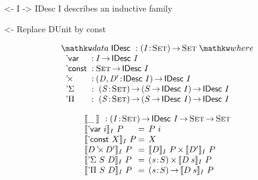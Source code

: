 \documentclass[preprint, authoryear, onecolumn]{sigplanconf}
\newenvironment{structure}{\footnotesize\verbatim}{\endverbatim}
\begin{document}

\begin{structure}
<- I -> IDesc I describes an inductive family
\end{structure}

\begin{structure}
<- Replace DUnit by const
\end{structure}


\[
\stk{
\data \IDesc{} : \PI{\V{I}}{\Set} \Set \where \\
\;\;\begin{array}{@{}l@{\::\:}l@{\quad}l}
    \DVar{}         & I \To \IDesc{I}                                   \\
    \DConst{}       & \Set \To \IDesc{I}                                \\
    \DProd{}{}      & \PI{\V{D}, \V{D'}}{\IDesc{I}} \IDesc{I}           \\
    \DSigma         & \PI{\V{S}}{\Set} \PIS{S \To \IDesc{I}} \IDesc{I}  \\
    \DPi            & \PI{\V{S}}{\Set} \PIS{S \To \IDesc{I}} \IDesc{I} 
\end{array}
}
\]


\[\stk{
\idescop{\_\:}{}{} : \PI{\V{I}}{\Set} \IDesc{I} \To \Set \To \Set                  \\
\begin{array}{@{}l@{\:=\:\:}ll}
\idescop{\DVar{i}}{I}{P}      &  P~i                                                 \\
\idescop{\DConst{X}}{I}{P}    &  X                                                   \\
\idescop{\DProd{D}{D'}}{I}{P} &  \TIMES{\idescop{D}{I}{P}}{\idescop{D'}{I}{P}}       \\
\idescop{\DSigma{S}{D}}{I}{P} &  \SIGMA{\V{s}}{S} \idescop{D\: s}{I}{P}                    \\
\idescop{\DPi{S}{D}}{I}{P}    &  \PI{\V{s}}{S} \idescop{D\: s}{I}{P}            
\end{array}
}\]
\end{document}
